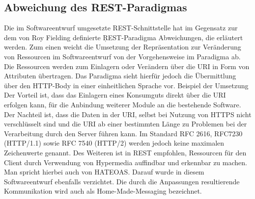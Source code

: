\subsection*{Abweichung des \ac{REST}-Paradigmas}
Die im Softwareentwurf umgesetzte \ac{REST}-Schnittstelle hat im Gegensatz zur dem von Roy Fielding definierte \c{REST}-Paradigma Abweichungen, die erläutert werden.
Zum einen weicht die Umsetzung der Repräsentation zur Veränderung von Ressourcen im Softwareentwurf von der Vorgehensweise im Paradigma ab.
Die Ressourcen werden zum Einlagern oder Verändern über die \ac{URI} in Form von Attributen übertragen.
Das Paradigma sieht hierfür jedoch die Übermittlung über den \ac{HTTP}-Body in einer einheitlichen Sprache vor.
Beispiel der Umsetzung
Der Vorteil ist, dass das Einlagern eines Konsumguts direkt über die \ac{URI} erfolgen kann, für die Anbindung weiterer Module an die bestehende Software.
Der Nachteil ist, dass die Daten in der \ac{URI}, selbst bei Nutzung von \ac{HTTPS} nicht verschlüsselt sind und die \ac{URI} ab einer bestimmten Länge zu Problemen bei der Verarbeitung durch den Server führen kann.
Im Standard RFC 2616, RFC7230 (HTTP/1.1) sowie RFC 7540 (HTTP/2) werden jedoch keine maximalen Zeichenwerte genannt.
Des Weiteren ist in \ac{REST} empfohlen, Ressourcen für den Client durch Verwendung von Hypermedia auffindbar und erkennbar zu machen.
Man spricht hierbei auch von \ac{HATEOAS}. Darauf wurde in diesem Softwareentwurf ebenfalls verzichtet.
Die durch die Anpassungen resultierende Kommunikation wird auch als Home-Made-Messaging bezeichnet.